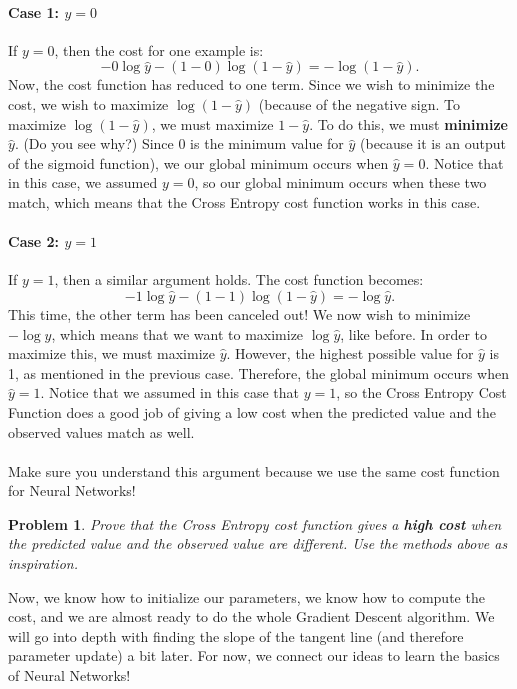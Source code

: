 \documentclass{article}
\newtheorem*{problem}{Problem}
\begin{document}
\paragraph{Case 1: $y=0$} If $y=0$, then the cost for one example is:
\[-0\log{\hat{y}}-(1-0)\log{(1-\hat{y})}=-\log{(1-\hat{y})}.\]
Now, the cost function has reduced to one term. Since we wish to minimize the cost, we wish to maximize $\log{(1-\hat{y})}$ (because of the negative sign. To maximize $\log{(1-\hat{y})}$, we must maximize $1-\hat{y}$. To do this, we must \textbf{minimize} $\hat{y}$. (Do you see why?) Since 0 is the minimum value for $\hat{y}$ (because it is an output of the sigmoid function), we our global minimum occurs when $\hat{y}=0$. Notice that in this case, we assumed $y=0$, so our global minimum occurs when these two match, which means that the Cross Entropy cost function works in this case. 
\paragraph{Case 2: $y=1$} If $y=1$, then a similar argument holds. The cost function becomes: 
\[-1\log{\hat{y}}-(1-1)\log{(1-\hat{y})}=-\log{\hat{y}}.\]
This time, the other term has been canceled out! We now wish to minimize $-\log{\hat{y}}$, which means that we want to maximize $\log{\hat{y}}$, like before. In order to maximize this, we must maximize $\hat{y}$. However, the highest possible value for $\hat{y}$ is 1, as mentioned in the previous case. Therefore, the global minimum occurs when $\hat{y}=1$. Notice that we assumed in this case that $y=1$, so the Cross Entropy Cost Function does a good job of giving a low cost when the predicted value and the observed values match as well. 
\\
\\
Make sure you understand this argument because we use the same cost function for Neural Networks!
\begin{problem}
Prove that the Cross Entropy cost function gives a \textbf{high cost} when the predicted value and the observed value are different. Use the methods above as inspiration.
\end{problem}
Now, we know how to initialize our parameters, we know how to compute the cost, and we are almost ready to do the whole Gradient Descent algorithm. We will go into depth with finding the slope of the tangent line (and therefore parameter update) a bit later. For now, we connect our ideas to learn the basics of Neural Networks!

\end{document}
